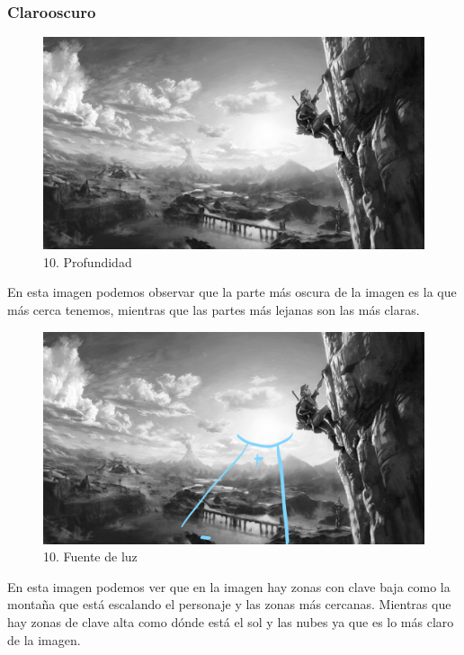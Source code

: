 \documentclass[12pt]{article}
\begin{document}
    \subsubsection{Clarooscuro}
    \begin{figure}[H]
      \centering
      \includegraphics[width=\textwidth]{images/Selena/10_concept_art grises.jpg}
      \caption{\small 10. Profundidad}
    \end{figure}
    En esta imagen podemos observar que la parte más oscura de la imagen es la que más cerca tenemos, mientras que las partes más lejanas son las más claras.
    \begin{figure}[H]
      \centering
      \includegraphics[width=\textwidth]{images/Selena/Inked10_concept_art grises lineas.jpg}
      \caption{\small 10. Fuente de luz}
    \end{figure}
    En esta imagen podemos ver que en la imagen hay zonas con clave baja  como la montaña que está escalando el personaje y las zonas más cercanas. Mientras que hay zonas de clave alta como dónde está el sol y las nubes ya que es lo más claro de la imagen.
    
\end{document}

